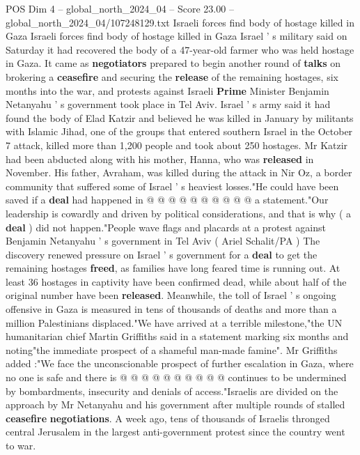 \begin{textsample}{POS Dim 4 – global\_north\_2024\_04 – Score 23.00 – global\_north\_2024\_04/107248129.txt}  \label{ex:f4_pos_361}
Israeli forces find body of hostage killed in Gaza Israeli forces find body of hostage killed in Gaza Israel ' s military said on Saturday it had recovered the body of a 47-year-old farmer who was held hostage in Gaza.
It came as \textbf{negotiators} prepared to begin another round of \textbf{talks} on brokering a \textbf{ceasefire} and securing the \textbf{release} of the remaining hostages, six months into the war, and protests against Israeli \textbf{Prime} Minister Benjamin Netanyahu ' s government took place in Tel Aviv.
Israel ' s army said it had found the body of Elad Katzir and believed he was killed in January by militants with Islamic Jihad, one of the groups that entered southern Israel in the October 7 attack, killed more than 1,200 people and took about 250 hostages.
Mr Katzir had been abducted along with his mother, Hanna, who was \textbf{released} in November.
His father, Avraham, was killed during the attack in Nir Oz, a border community that suffered some of Israel ' s heaviest losses."He could have been saved if a \textbf{deal} had happened in @ @ @ @ @ @ @ @ @ @ a statement."Our leadership is cowardly and driven by political considerations, and that is why ( a \textbf{deal} ) did not happen."People wave flags and placards at a protest against Benjamin Netanyahu ' s government in Tel Aviv ( Ariel Schalit/PA ) The discovery renewed pressure on Israel ' s government for a \textbf{deal} to get the remaining hostages \textbf{freed}, as families have long feared time is running out.
At least 36 hostages in captivity have been confirmed dead, while about half of the original number have been \textbf{released}.
Meanwhile, the toll of Israel ' s ongoing offensive in Gaza is measured in tens of thousands of deaths and more than a million Palestinians displaced."We have arrived at a terrible milestone,"the UN humanitarian chief Martin Griffiths said in a statement marking six months and noting"the immediate prospect of a shameful man-made famine".
Mr Griffiths added :"We face the unconscionable prospect of further escalation in Gaza, where no one is safe and there is @ @ @ @ @ @ @ @ @ @ continues to be undermined by bombardments, insecurity and denials of access."Israelis are divided on the approach by Mr Netanyahu and his government after multiple rounds of stalled \textbf{ceasefire} \textbf{negotiations}.
A week ago, tens of thousands of Israelis thronged central Jerusalem in the largest anti-government protest since the country went to war.

\end{textsample}
